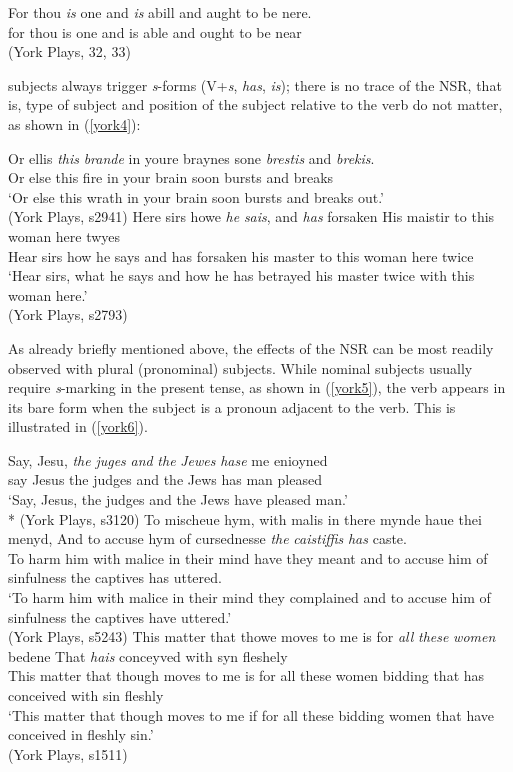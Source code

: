 \documentclass[output=paper]{langsci/langscibook}
\begin{document}
\ea
\gll For thou \textit{is} one and \textit{is} abill and aught to be nere.\\
for thou is one and is able and ought to be near\\
\glt (York Plays, 32, 33)
\z

\Tsg{} subjects always trigger \emph{s}-forms (V+\emph{s}, \emph{has},
\emph{is}); there is no trace of the \gls{NSR}, that
is, type of subject and position of the subject relative to the verb do not
matter, as shown in (\ref{york4}):

\ea
\label{york4}
\ea \gll Or ellis \textit{this} \textit{brande} in youre braynes sone \textit{brestis} and \textit{brekis}.\\
Or else this fire in your brain soon bursts and breaks\\
\glt `Or else this wrath in your brain soon bursts and breaks out.'\\
(York Plays, s2941)
\ex \gll Here sirs howe \textit{he} \textit{sais}, and \textit{has} forsaken His maistir to this woman here twyes \\
Hear sirs how he says and has forsaken his master to this woman here twice\\
\glt `Hear sirs, what he says and how he has betrayed his master twice with this woman here.'\\
(York Plays, s2793)
\z
\z

As already briefly mentioned above, the effects of the \gls{NSR} can be most readily observed with plural (pronominal) subjects. While nominal \Tpl{} subjects usually require \emph{s}-marking in the present tense, as shown in (\ref{york5}), the verb appears in its bare form when the subject is a pronoun adjacent to the verb. This is illustrated in (\ref{york6}).

\ea
\label{york5}
\ea
\gll Say, Jesu, \textit{the} \textit{juges} \textit{and} \textit{the} \textit{Jewes} \textit{hase} me enioyned\\
say Jesus the judges and the Jews has man pleased\\
\glt `Say, Jesus, the judges and the Jews have pleased man.'\\*
(York Plays, s3120)
\ex
\gll To mischeue hym, with malis in there mynde haue thei menyd,
And to accuse hym of cursednesse \textit{the} \textit{caistiffis} \textit{has} caste. \\
To harm him with malice in their mind have they meant and to accuse him of sinfulness the captives has uttered.\\
\glt `To harm him with malice in their mind they  complained and to accuse him of sinfulness the captives have uttered.'\\
(York Plays, s5243)
\ex
\gll This matter that thowe moves to me is for \textit{all} \textit{these} \textit{women} bedene That \textit{hais} conceyved with syn fleshely \\
    This matter that though moves to me is for all these women bidding that has conceived with sin fleshly\\
\glt `This matter that though moves to me if for all these bidding women that have conceived in fleshly sin.'\\
(York Plays, s1511)
\z
\z
\end{document}
